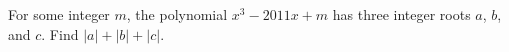 For some integer $m$, the polynomial $x^{3}-2011x+m$ has three integer roots $a$, $b$, and $c$. Find $|a|+|b|+|c|$. 